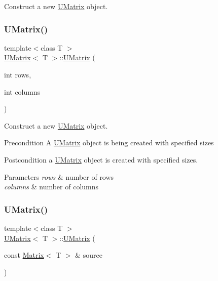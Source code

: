 Construct a new \mbox{\hyperlink{class_u_matrix}{U\+Matrix}} object. 

\mbox{\label{class_u_matrix_ad0d2d3e05ad904daed36504eddd25a2c}} 
\subsubsection{\texorpdfstring{UMatrix()}{UMatrix()}\hspace{0.1cm}{\footnotesize\ttfamily [2/5]}}
{\footnotesize\ttfamily template$<$class T $>$ \\
\mbox{\hyperlink{class_u_matrix}{U\+Matrix}}$<$ T $>$\+::\mbox{\hyperlink{class_u_matrix}{U\+Matrix}} (\begin{DoxyParamCaption}\item[{int}]{rows,  }\item[{int}]{columns }\end{DoxyParamCaption})}



Construct a new \mbox{\hyperlink{class_u_matrix}{U\+Matrix}} object. 

\begin{DoxyPrecond}{Precondition}
A \mbox{\hyperlink{class_u_matrix}{U\+Matrix}} object is being created with specified sizes 
\end{DoxyPrecond}
\begin{DoxyPostcond}{Postcondition}
a \mbox{\hyperlink{class_u_matrix}{U\+Matrix}} object is created with specified sizes.
\end{DoxyPostcond}

\begin{DoxyParams}{Parameters}
{\em rows} & number of rows \\
\hline
{\em columns} & number of columns \\
\hline
\end{DoxyParams}
\mbox{\label{class_u_matrix_a784cebb7d674ada97720bcb34f49ca6b}} 
\subsubsection{\texorpdfstring{UMatrix()}{UMatrix()}\hspace{0.1cm}{\footnotesize\ttfamily [3/5]}}
{\footnotesize\ttfamily template$<$class T $>$ \\
\mbox{\hyperlink{class_u_matrix}{U\+Matrix}}$<$ T $>$\+::\mbox{\hyperlink{class_u_matrix}{U\+Matrix}} (\begin{DoxyParamCaption}\item[{const \mbox{\hyperlink{class_matrix}{Matrix}}$<$ T $>$ \&}]{source }\end{DoxyParamCaption})}



